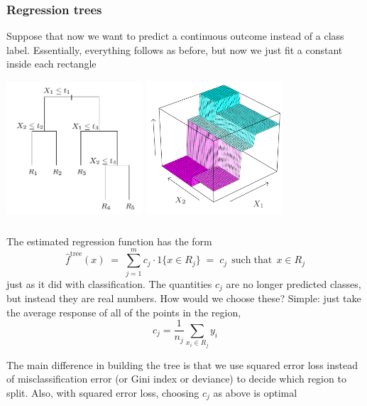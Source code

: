 \documentclass[mathserif]{beamer}
\def\red{\color[rgb]{0.8,0,0}}
\begin{document}
\begin{frame}
\frametitle{Regression trees}
Suppose that now we want to predict a {\red continuous} outcome instead of a class
label. Essentially, everything follows as before, but now we just fit a constant 
inside each rectangle

\smallskip
\begin{center}
\includegraphics[width=2in]{ex1-tree.png}
\includegraphics[width=2in]{regtree.png}
\end{center}
\end{frame}

\begin{frame}
\frametitle{}
\smallskip
The estimated regression function has the form
$$\hat{f}^\mathrm{tree}(x) \;=\; \sum_{j=1}^m c_j \cdot 1\{x \in R_j\}
\;=\; c_j \;\, \mathrm{such}\;\mathrm{that}\;\, x \in R_j$$
just as it did with classification. The quantities $c_j$ are
no longer predicted classes, but instead they are real numbers. 
How would we choose these? Simple: just take the average response of all of the
points in the region,
$$c_j = \frac{1}{n_j} \sum_{x_i \in R_j} y_i$$ 

The main difference in building the tree is that we use {\red squared error loss} 
instead of misclassification error (or Gini index or deviance) to decide which region
to split. Also, with squared error loss, choosing $c_j$ as above is optimal
\end{frame}
\end{document}
